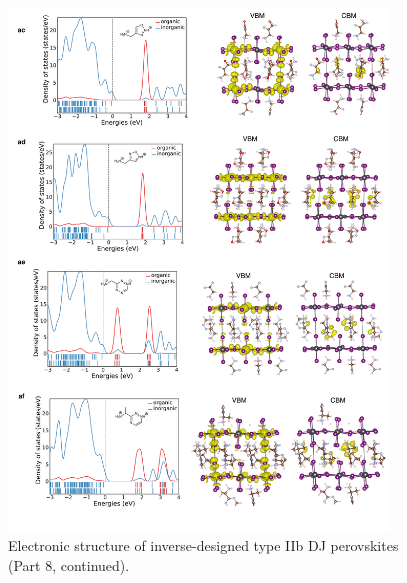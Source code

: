 \begin{figure}[htbp]
    \ContinuedFloat
    \centering
    \includegraphics[width=0.9\textwidth]{figures/synthesis-feasibility/figure5-25-8.png}
    \caption{Electronic structure of inverse-designed type IIb DJ perovskites (Part 8, continued).}
\end{figure}

